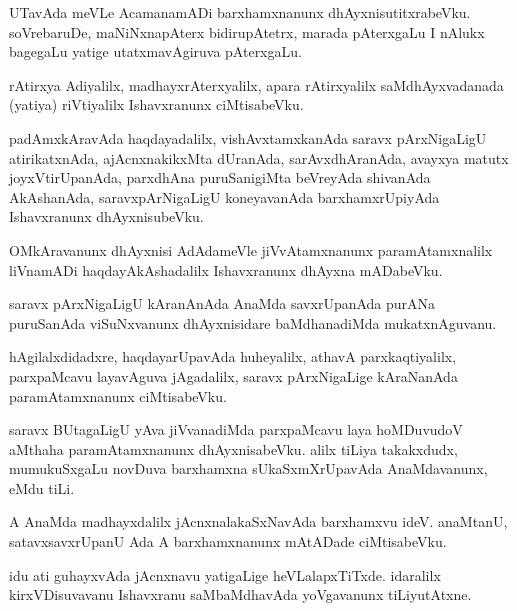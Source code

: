 \documentclass{article}
\begin{document}
\begin{mn}
UTavAda meVLe AcamanamADi barxhamxnanunx dhAyxnisutitxrabeVku. soVrebaruDe, maNiNxnapAterx 
bidirupAtetrx, marada pAterxgaLu I nAlukx bagegaLu yatige utatxmavAgiruva pAterxgaLu.
\end{mn}

\begin{mn}
rAtirxya Adiyalilx, madhayxrAterxyalilx, apara rAtirxyalilx saMdhAyxvadanada (yatiya) riVtiyalilx 
Ishavxranunx ciMtisabeVku.
\end{mn}

\begin{mn}
padAmxkAravAda haqdayadalilx, vishAvxtamxkanAda saravx pArxNigaLigU atirikatxnAda, ajAcnxnakikxMta
dUranAda, sarAvxdhAranAda, avayxya matutx joyxVtirUpanAda, parxdhAna puruSanigiMta beVreyAda 
shivanAda AkAshanAda, saravxpArNigaLigU koneyavanAda barxhamxrUpiyAda Ishavxranunx dhAyxnisubeVku.
\end{mn}

\begin{mn}
OMkAravanunx dhAyxnisi AdAdameVle jiVvAtamxnanunx paramAtamxnalilx liVnamADi haqdayAkAshadalilx 
Ishavxranunx dhAyxna mADabeVku.
\end{mn}

\begin{mn}
saravx pArxNigaLigU kAranAnAda AnaMda savxrUpanAda purANa puruSanAda viSuNxvanunx dhAyxnisidare 
baMdhanadiMda mukatxnAguvanu.
\end{mn}

\begin{mn}
hAgilalxdidadxre, haqdayarUpavAda huheyalilx, athavA parxkaqtiyalilx, parxpaMcavu layavAguva 
jAgadalilx, saravx pArxNigaLige kAraNanAda paramAtamxnanunx ciMtisabeVku.
\end{mn}

\begin{mn}
saravx BUtagaLigU yAva jiVvanadiMda parxpaMcavu laya hoMDuvudoV aMthaha paramAtamxnanunx 
dhAyxnisabeVku. alilx tiLiya takakxdudx, mumukuSxgaLu novDuva barxhamxna sUkaSxmXrUpavAda 
AnaMdavanunx, eMdu tiLi.
\end{mn}

\begin{mn}
A AnaMda madhayxdalilx jAcnxnalakaSxNavAda barxhamxvu ideV. anaMtanU, satavxsavxrUpanU Ada A 
barxhamxnanunx mAtADade ciMtisabeVku.
\end{mn}

\begin{mn}
idu ati guhayxvAda jAcnxnavu yatigaLige heVLalapxTiTxde. idaralilx kirxVDisuvavanu Ishavxranu 
saMbaMdhavAda yoVgavanunx tiLiyutAtxne.
\end{mn}
\end{document}
